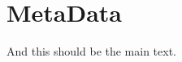 
\def\mytitle{This should be a $<$title$>$ element}
\def\myauthor{This should be the author}

\def\bibliocommand{}
\def\mydate{January 1, 2011}
\def\emptymetadata{}


\part{MetaData}
\label{metadata}

And this should be the main text.




